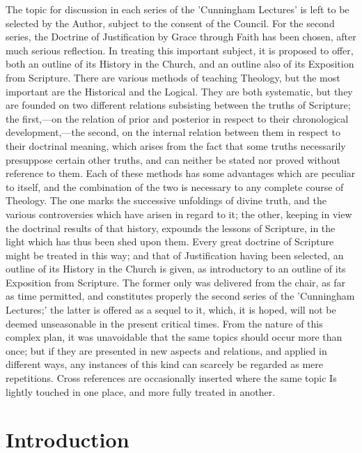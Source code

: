 \documentclass[
]{book}
\begin{document}
The topic for discussion in each series of the 'Cunningham Lectures' is left to be selected by the Author, subject to the consent of the Council. For the second series, the Doctrine of Justification by Grace through Faith has been chosen, after much serious reflection. In treating this important subject, it is proposed to offer, both an outline of its History in the Church, and an outline also of its Exposition from Scripture. There are various methods of teaching Theology, but the most important are the Historical and the Logical. They are both systematic, but they are founded on two different relations subsisting between the truths of Scripture; the first,---on the relation of prior and posterior in respect to their chronological development,---the second, on the internal relation between them in respect to their doctrinal meaning, which arises from the fact that some truths necessarily presuppose certain other truths, and can neither be stated nor proved without reference to them. Each of these methods has some advantages which are peculiar to itself, and the combination of the two is necessary to any complete course of Theology. The one marks the successive unfoldings of divine truth, and the various controversies which have arisen in regard to it; the other, keeping in view the doctrinal results of that history, expounds the lessons of Scripture, in the light which has thus been shed upon them. Every great doctrine of Scripture might be treated in this way; and that of Justification having been selected, an outline of its History in the Church is given, as introductory to an outline of its Exposition from Scripture. The former only was delivered from the chair, as far as time permitted, and constitutes properly the second series of the 'Cunningham Lectures;' the latter is offered as a sequel to it, which, it is hoped, will not be deemed unseasonable in the present critical times. From the nature of this complex plan, it was unavoidable that the same topics should occur more than once; but if they are presented in new aspects and relations, and applied in different ways, any instances of this kind can scarcely be regarded as mere repetitions. Cross references are occasionally inserted where the same topic Is lightly touched in one place, and more fully treated in another.

\hypertarget{introduction}{%
\chapter{Introduction}\label{introduction}}
\end{document}
